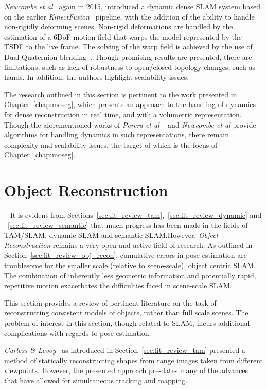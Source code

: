 \textit{Newcombe et al}~\cite{Newcombe2015} again in 2015, introduced a dynamic dense SLAM 
system based on the earlier \textit{KinectFusion}~\cite{Newcombe2015} pipeline, with the addition 
of the ability to handle non-rigidly deforming scenes. Non-rigid deformations are handled by the 
estimation of a 6DoF motion field that warps the model represented by the TSDF to the live frame. The 
solving of the warp field is achieved by the use of Dual Quaternion blending~\cite{Kavan2006}. 
Though promising results are presented, there are limitations, such as lack of robustness to 
open/closed topology changes, such as hands. In addition, the authors highlight scalability issues.

The research outlined in this section is pertinent to the work presented in Chapter~\ref{chap:moseg}, 
which presents an approach to the handling of dynamics for dense reconstruction in real time, and 
with a volumetric representation. Though the aforementioned works of \textit{Perera et al}
~\cite{Perera2015} and \textit{Newcombe et al} provide algorithms for handling dynamics in such 
representations, there remain complexity and scalability issues, the target of which is the focus of 
Chapter~\ref{chap:moseg}.

\section{Object Reconstruction}
~\label{sec:lit_review_obj_recon}
It is evident from Sections~\ref{sec:lit_review_tam},~\ref{sec:lit_review_dynamic} and 
~\ref{sec:lit_review_semantic} that much progress has been made in the fields of TAM/SLAM, 
dynamic SLAM and semantic SLAM.\@ However, \textit{Object Reconstruction} remains a very open 
and active field of research. As outlined in Section~\ref{sec:lit_review_obj_recon}, cumulative 
errors in pose estimation are troublesome for the smaller scale (relative to scene-scale), 
object centric SLAM\@. The combination of inherently less geometric information and potentially 
rapid, repetitive motion exacerbates the difficulties faced in scene-scale SLAM\@.

This section provides a review of pertinent literature on the task of reconstructing consistent 
models of objects, rather than full scale scenes. The problem of interest in this section, though 
related to SLAM, incurs additional complications with regards to pose estimation.

\textit{Curless \& Levoy}~\cite{Curless1996} as introduced in Section~\ref{sec:lit_review_tam} 
presented a method of statically reconstructing shapes from range images taken from different 
viewpoints. However, the presented approach pre-dates many of the advances that have allowed 
for simultaneous tracking and mapping.


